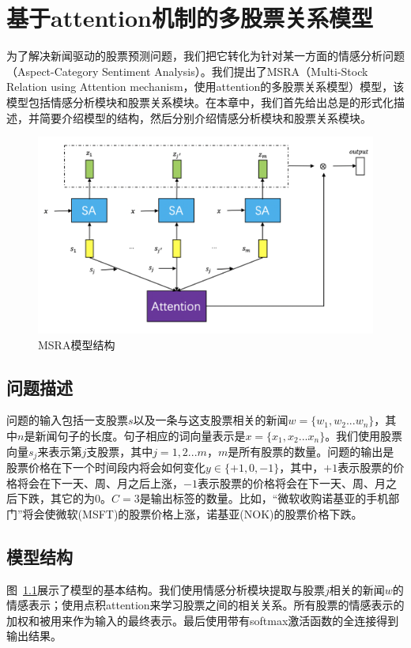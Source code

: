 \chapter{基于attention机制的多股票关系模型}
\label{cha: msra}
为了解决新闻驱动的股票预测问题，我们把它转化为针对某一方面的情感分析问题（Aspect-Category Sentiment Analysis）。我们提出了MSRA（Multi-Stock Relation using Attention mechanism，使用attention的多股票关系模型）模型，该模型包括情感分析模块和股票关系模块。在本章中，我们首先给出总是的形式化描述，并简要介绍模型的结构，然后分别介绍情感分析模块和股票关系模块。
\begin{figure}[H] %
    \centering
    \includegraphics[width =\linewidth]{figures/stock-relation.png}
    \caption{MSRA模型结构}
    \label{fig: modelstructure}
\end{figure}

\section{问题描述}

问题的输入包括一支股票$s$以及一条与这支股票相关的新闻$w =\{w_1, w_2...w_n\}$，其中$n$是新闻句子的长度。句子相应的词向量表示是$x =\{x_1, x_2...x_n\}$。我们使用股票向量$s_j$来表示第$j$支股票，其中$j = 1, 2...m$，$m$是所有股票的数量。问题的输出是股票价格在下一个时间段内将会如何变化$y\in \{+1, 0, -1\}$，其中，$+ 1$表示股票的价格将会在下一天、周、月之后上涨，$- 1$表示股票的价格将会在下一天、周、月之后下跌，其它的为$0$。$C = 3$是输出标签的数量。比如，“微软收购诺基亚的手机部门”将会使微软(MSFT)的股票价格上涨，诺基亚(NOK)的股票价格下跌。
\section{模型结构}
图~\ref{fig: modelstructure}展示了模型的基本结构。我们使用情感分析模块提取与股票$j$相关的新闻$w$的情感表示；使用点积attention来学习股票之间的相关关系。所有股票的情感表示的加权和被用来作为输入的最终表示。最后使用带有softmax激活函数的全连接得到输出结果。
